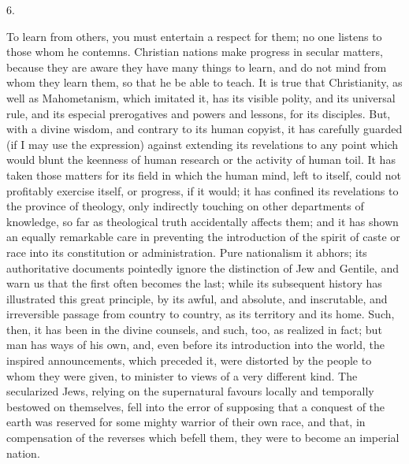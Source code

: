 6.

To learn from others, you must
entertain a respect for them; no one listens to those whom he
contemns. Christian nations make progress in secular matters, because
they are aware they have many things to learn, and do not mind from
whom they learn them, so that he be able to teach. It is true that
Christianity, as well as Mahometanism, which imitated it, has its
visible polity, and its universal rule, and its especial prerogatives
and powers and lessons, for its disciples. But, with a divine wisdom,
and contrary to its human copyist, it has carefully guarded (if I may
use the expression) against extending its revelations to any point
which would blunt the keenness of human research or the activity of
human toil. It has taken those matters for its field in which the
human mind, left to itself, could not profitably exercise itself, or
progress, if it would; it has confined its revelations to the province
of theology, only indirectly touching on other departments of
knowledge, so far as theological truth accidentally affects them; and
it has shown an equally remarkable care in preventing the introduction
of the spirit of caste or race into its constitution or
administration. Pure nationalism it abhors; its authoritative
documents pointedly ignore the distinction of Jew and Gentile, and
warn us that the first often becomes the last; while its subsequent
history has illustrated this great principle, by its awful, and
absolute, and inscrutable, and irreversible passage from country to
country, as its territory and its home. Such, then, it has been in the
divine counsels, and such, too, as realized in fact; but man has ways
of his own, and, even before its introduction into the world, the
inspired announcements, which preceded it, were distorted by the
people to whom they were given, to minister to views of a very
different kind. The secularized Jews, relying on the supernatural
favours locally and temporally bestowed on themselves, fell into the
error of supposing that a conquest of the earth was reserved for some
mighty warrior of their own race, and that, in compensation of the
reverses which befell them, they were to become an imperial nation.

